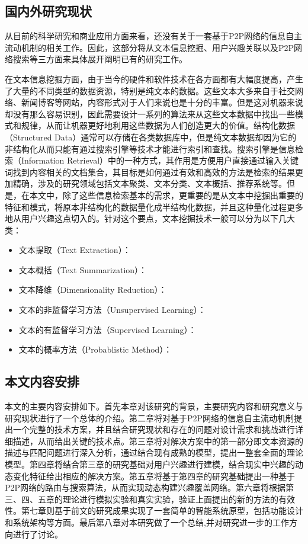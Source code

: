 \subsection{国内外研究现状}
从目前的科学研究和商业应用方面来看，还没有关于一套基于P2P网络的信息自主流动机制的相关工作。因此，这部分将从文本信息挖掘、用户兴趣关联以及P2P网络搜索等三方面来具体展开阐明已有的研究工作。

在文本信息挖掘方面，由于当今的硬件和软件技术在各方面都有大幅度提高，产生了大量的不同类型的数据资源\cite{8}，特别是纯文本的数据。这些文本大多来自于社交网络、新闻博客等网站，内容形式对于人们来说也是十分的丰富。但是这对机器来说却没有那么容易识别，因此需要设计一系列的算法来从这些文本数据中找出一些模式和规律，从而让机器更好地利用这些数据为人们创造更大的价值。结构化数据（Structured Data）通常可以存储在各类数据库中，但是纯文本数据却因为它的非结构化从而只能有通过搜索引擎等技术才能进行索引和查找\cite{5}。搜索引擎是信息检索（Information Retrieval）中的一种方式，其作用是方便用户直接通过输入关键词找到内容相关的文档集合，其目标是如何通过有效和高效的方法是检索的结果更加精确，涉及的研究领域包括文本聚类、文本分类、文本概括、推荐系统等\cite{12,9,7}。但是，在本文中，除了这些信息检索基本的需求，更重要的是从文本中挖掘出重要的特征和模式，将原本非结构化的数据量化成半结构化数据，并且这种量化过程更多地从用户兴趣这点切入的。针对这个要点，文本挖掘技术一般可以分为以下几大类：

\begin{itemize}
\item 文本提取（Text Extraction）：
\item 文本概括（Text Summarization）：
\item 文本降维（Dimensionality Reduction）：
\item 文本的非监督学习方法（Unsupervised Learning）：
\item 文本的有监督学习方法（Supervised Learning）：
\item 文本的概率方法（Probablistic Method）：
\end{itemize}

\subsection{本文内容安排}
本文的主要内容安排如下。首先本章对该研究的背景，主要研究内容和研究意义与研究现状进行了一个总体的介绍。第二章将对基于P2P网络的信息自主流动机制提出一个完整的技术方案，并且结合研究现状和存在的问题对设计需求和挑战进行详细描述，从而给出关键的技术点。第三章将对解决方案中的第一部分即文本资源的描述与匹配问题进行深入分析，通过结合现有成熟的模型，提出一整套全面的理论模型。第四章将结合第三章的研究基础对用户兴趣进行建模，结合现实中兴趣的动态变化特征给出相应的解决方案。第五章将基于第四章的研究基础提出一种基于P2P网络的路由与搜索算法，从而实现动态构建兴趣覆盖网络。第六章将根据第三、四、五章的理论进行模拟实验和真实实验，验证上面提出的新的方法的有效性。第七章则基于前文的研究成果实现了一套简单的智能系统原型，包括功能设计和系统架构等方面。最后第八章对本研究做了一个总结,并对研究进一步的工作方向进行了讨论。

